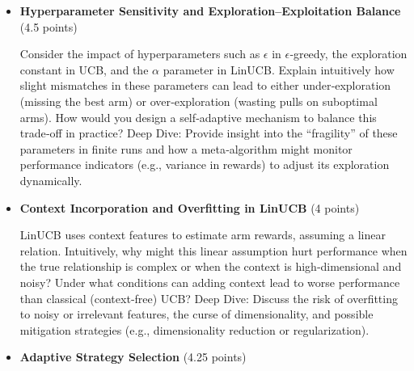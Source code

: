 \documentclass[12pt]{article}
\begin{document}
{{{\begin{itemize}[noitemsep]
    \vspace{0.25cm}
    Many algorithms (e.g., UCB) are analyzed using asymptotic (long‑term) regret bounds. In a finite‑horizon scenario (say, 500–1000 steps), explain intuitively why an algorithm that is asymptotically optimal may still yield poor performance. What trade‑offs arise between aggressive early exploration and cautious long‑term learning?
    Deep Dive:
    Discuss how the exploration bonus, tuned for asymptotic behavior, might delay exploitation in finite time, leading to high early regret despite eventual convergence.
    \vspace{0.5cm}
    \item \textbf{Hyperparameter Sensitivity and Exploration–Exploitation Balance} (4.5 points)

    \vspace{0.25cm}
    Consider the impact of hyperparameters such as $\epsilon$ in $\epsilon$‑greedy, the exploration constant in UCB, and the $\alpha$ parameter in LinUCB. Explain intuitively how slight mismatches in these parameters can lead to either under‑exploration (missing the best arm) or over‑exploration (wasting pulls on suboptimal arms). How would you design a self‑adaptive mechanism to balance this trade‑off in practice?
    Deep Dive:
    Provide insight into the “fragility” of these parameters in finite runs and how a meta‑algorithm might monitor performance indicators (e.g., variance in rewards) to adjust its exploration dynamically.
    \vspace{0.5cm}
    
    \newpage
    
    \item \textbf{Context Incorporation and Overfitting in LinUCB} (4 points)

    \vspace{0.25cm}
    LinUCB uses context features to estimate arm rewards, assuming a linear relation. Intuitively, why might this linear assumption hurt performance when the true relationship is complex or when the context is high‑dimensional and noisy? Under what conditions can adding context lead to worse performance than classical (context‑free) UCB?
    Deep Dive:
    Discuss the risk of overfitting to noisy or irrelevant features, the curse of dimensionality, and possible mitigation strategies (e.g., dimensionality reduction or regularization).
    \vspace{0.5cm}
    \item \textbf{Adaptive Strategy Selection} (4.25 points)


\end{itemize}}}}
\end{document}

